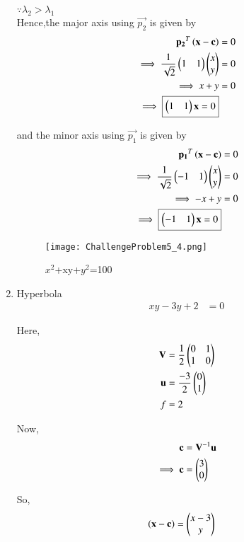 \documentclass[journal,12pt,twocolumn]{IEEEtran}
\begin{document}
\begin{enumerate}
    $\because \lambda_2>\lambda_1$ \\
    Hence,the major axis using $\vec{p_2}$ is given by
    \begin{align}
        \mathbf{p_2}^T\left(\mathbf{x}-\mathbf{c}\right) &= 0 \\
        \implies \frac{1}{\sqrt{2}}\begin{pmatrix}1 & 1\end{pmatrix}\begin{pmatrix}x \\ y\end{pmatrix} &= 0 \\
        \implies x+y &= 0 \\
        \implies \boxed{\begin{pmatrix}1 & 1\end{pmatrix}\mathbf{x} =0}
    \end{align}
    
    and the minor axis using $\vec{p_1}$ is given by
    \begin{align}
        \mathbf{p_1}^T\left(\mathbf{x}-\mathbf{c}\right) &= 0 \\
        \implies \frac{1}{\sqrt{2}}\begin{pmatrix}-1 & 1\end{pmatrix}\begin{pmatrix}x \\ y\end{pmatrix} &= 0 \\
        \implies -x+y &= 0 \\
        \implies \boxed{\begin{pmatrix}-1 & 1\end{pmatrix}\mathbf{x} =0}
    \end{align}
    
    \begin{figure}[!ht]
    \centering
    \texttt{[image: ChallengeProblem5\_4.png]}
    \caption{$x^2$+xy+$y^2$=100}
    \label{ex4}	
    \end{figure}
    
    \item Hyperbola
    \begin{align}
        xy-3y+2 &= 0
    \end{align}
    
    Here,
    \begin{align}
    \mathbf{V} &= \frac{1}{2}\begin{pmatrix}0 & 1 \\ 1 & 0\end{pmatrix} \\
    \mathbf{u} &= \frac{-3}{2}\begin{pmatrix}0 \\ 1\end{pmatrix} \\
    f &= 2
    \end{align}

    Now,
    \begin{align}
    \mathbf{c} &= \mathbf{V}^{-1}\mathbf{u}\\
    \implies \mathbf{c} &= \begin{pmatrix}3 \\ 0\end{pmatrix}
    \end{align}

    So,
    \begin{align}
    \left(\mathbf{x}-\mathbf{c}\right) &= \begin{pmatrix}x-3 \\ y\end{pmatrix}
    \end{align}


\end{enumerate}
\end{document}
